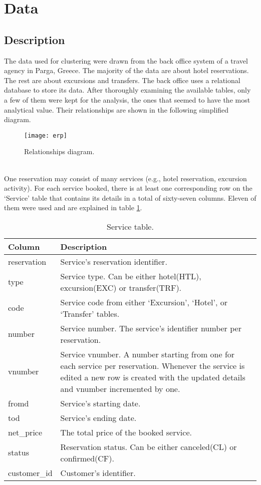 \section{Data}

\subsection{Description}
The data used for clustering were drawn from the back office system of a travel agency in Parga, Greece. The majority of the data are about hotel reservations. The rest are about excursions and transfers. The back office uses a relational database to store its data. After thoroughly examining the available tables, only a few of them were kept for the analysis, the ones that seemed to have the most analytical value. Their relationships are shown in the following simplified diagram. \\
\begin{figure}[ht]
\texttt{[image: erp]}
\caption{Relationships diagram.}
\label{fig:erp}
\end{figure}
\\
One reservation may consist of many services (e.g., hotel reservation, excursion activity). For each service booked, there is at least one corresponding row on the `Service' table that contains its details in a total of sixty-seven columns. Eleven of them were used and are explained in table \ref{tab:service}. \\
\begin{table}[ht]
\begin{center}
\begin{tabular}{l | p{12cm}}
\textcolor{theme}{\textbf{Column}} & \textcolor{theme}{\textbf{Description}}\\
\hline
reservation & Service's reservation identifier.\\
\hline
type & Service type. Can be either hotel(HTL), excursion(EXC) or transfer(TRF).\\
\hline
code & Service code from either `Excursion', `Hotel', or `Transfer' tables.\\
\hline
number & Service number. The service's identifier number per reservation.\\
\hline
vnumber & Service vnumber. A number starting from one for each service per reservation. Whenever the service is edited a new row is created with the updated details and vnumber incremented by one.\\
\hline
fromd & Service's starting date.\\
\hline
tod & Service's ending date.\\
\hline
net\_price & The total price of the booked service.\\
\hline
status & Reservation status. Can be either canceled(CL) or confirmed(CF). \\
\hline
customer\_id & Customer's identifier.\\
\hline
\end{tabular}
\caption{Service table.}
\label{tab:service}
\end{center}
\end{table}
